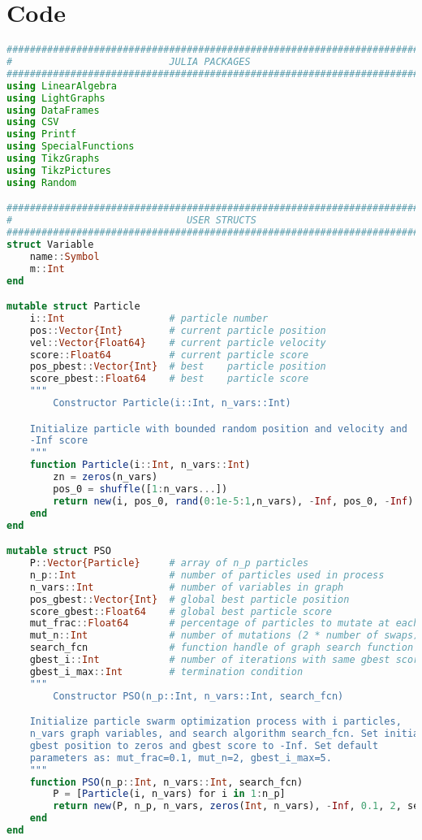 \documentclass[twoside,11pt]{article}
\begin{document}
\section{Code}
\begin{algorithm}
\begin{lstlisting}[language=Julia]
########################################################################
#                           JULIA PACKAGES                             #
########################################################################
using LinearAlgebra
using LightGraphs
using DataFrames
using CSV
using Printf
using SpecialFunctions
using TikzGraphs
using TikzPictures
using Random

########################################################################
#                              USER STRUCTS                            #
########################################################################
struct Variable
    name::Symbol
    m::Int
end

mutable struct Particle
    i::Int                  # particle number
    pos::Vector{Int}        # current particle position
    vel::Vector{Float64}    # current particle velocity
    score::Float64          # current particle score
    pos_pbest::Vector{Int}  # best    particle position
    score_pbest::Float64    # best    particle score
    """
        Constructor Particle(i::Int, n_vars::Int)

    Initialize particle with bounded random position and velocity and
    -Inf score
    """
    function Particle(i::Int, n_vars::Int)
        zn = zeros(n_vars)
        pos_0 = shuffle([1:n_vars...])
        return new(i, pos_0, rand(0:1e-5:1,n_vars), -Inf, pos_0, -Inf)
    end
end

mutable struct PSO
    P::Vector{Particle}     # array of n_p particles
    n_p::Int                # number of particles used in process
    n_vars::Int             # number of variables in graph
    pos_gbest::Vector{Int}  # global best particle position
    score_gbest::Float64    # global best particle score
    mut_frac::Float64       # percentage of particles to mutate at each iteration
    mut_n::Int              # number of mutations (2 * number of swaps)
    search_fcn              # function handle of graph search function
    gbest_i::Int            # number of iterations with same gbest score
    gbest_i_max::Int        # termination condition
    """
        Constructor PSO(n_p::Int, n_vars::Int, search_fcn)

    Initialize particle swarm optimization process with i particles,
    n_vars graph variables, and search algorithm search_fcn. Set initial
    gbest position to zeros and gbest score to -Inf. Set default 
    parameters as: mut_frac=0.1, mut_n=2, gbest_i_max=5.
    """
    function PSO(n_p::Int, n_vars::Int, search_fcn)
        P = [Particle(i, n_vars) for i in 1:n_p]
        return new(P, n_p, n_vars, zeros(Int, n_vars), -Inf, 0.1, 2, search_fcn, 0, 5)
    end
end


\end{lstlisting}
\end{algorithm}
\end{document}
